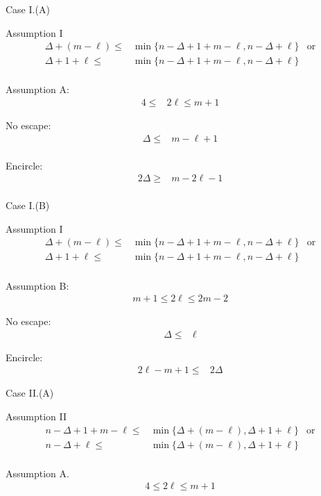 \documentclass[letterpaper, 10pt]{article}
\begin{document}
\theoremstyle{definition}
\newtheorem{definition}{Definition}
\newtheorem{theorem}{Theorem}
\newtheorem{proposition}{Proposition}
\newtheorem{corollary}{Corollary}
\newtheorem{lemma}{Lemma}
\newtheorem{proofpart}{Part}
\makeatletter
{}
\makeatother

{ \color{red} Case I.(A)

 Assumption I
\begin{align*}
  \Delta + (m - \ell) \leq &\min \{ n - \Delta +1 + m - \ell, n - \Delta + \ell \} & \text{or} \\
  \Delta + 1 + \ell \leq &\min \{ n - \Delta +1 + m - \ell, n - \Delta + \ell \} \\
\end{align*}

 Assumption A:
 \begin{align*}
  4 \leq & 2 \ell \leq m + 1
 \end{align*} }

{ \color{blue}
 No escape:
 \begin{align*}
  \Delta \leq & m- \ell + 1 \\
 \end{align*}

 Encircle:
 \begin{align*}
  2 \Delta \geq & m - 2\ell  -1 \\
 \end{align*} }

{ \color{red} Case I.(B)

 Assumption I
 \begin{align*}
   \Delta + (m - \ell) \leq &\min \{ n - \Delta +1 + m - \ell, n - \Delta + \ell \} & \text{or} \\
   \Delta + 1 + \ell \leq &\min \{ n - \Delta +1 + m - \ell, n - \Delta + \ell \}  \\
 \end{align*}

 Assumption B:
 \begin{align*}
  m + 1 \leq 2 \ell \leq 2m - 2
 \end{align*} }

{ \color{blue}
 No escape:
 \begin{align*}
  \Delta \leq & \ell
 \end{align*}

 Encircle:
 \begin{align*}
  2\ell - m + 1 \leq & 2 \Delta
 \end{align*} }

{ \color{red} Case II.(A)

 Assumption II
 \begin{align*}
  n - \Delta +1 + m - \ell \leq &\min \{\Delta + (m - \ell) ,\Delta + 1 + \ell  \} & \text{or} \\
   n - \Delta + \ell \leq &\min \{\Delta + (m - \ell) ,\Delta + 1 + \ell  \} \\
 \end{align*}

 Assumption A.
 \begin{align*}
  4 \leq 2 \ell \leq m + 1
 \end{align*} }
\end{document}
